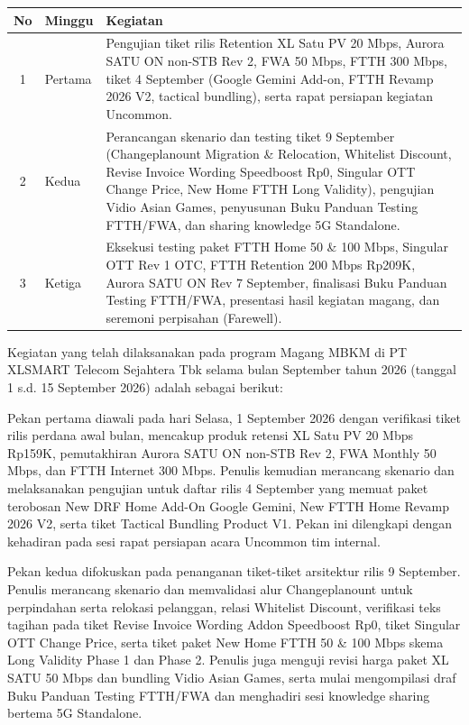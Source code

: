 \documentclass[12pt,a4paper]{article}
\begin{document}
\vspace{0.2cm}
\begin{singlespace}
\noindent
\begin{tabular}{|c|p{2.0cm}|p{11.5cm}|}
\hline
\textbf{No} & \textbf{Minggu} & \textbf{Kegiatan} \\
\hline
1 & Pertama & Pengujian tiket rilis Retention XL Satu PV 20 Mbps, Aurora SATU ON non-STB Rev 2, FWA 50 Mbps, FTTH 300 Mbps, tiket 4 September (Google Gemini Add-on, FTTH Revamp 2026 V2, tactical bundling), serta rapat persiapan kegiatan Uncommon. \\
\hline
2 & Kedua & Perancangan skenario dan testing tiket 9 September (Changeplanount Migration \& Relocation, Whitelist Discount, Revise Invoice Wording Speedboost Rp0, Singular OTT Change Price, New Home FTTH Long Validity), pengujian Vidio Asian Games, penyusunan Buku Panduan Testing FTTH/FWA, dan sharing knowledge 5G Standalone. \\
\hline
3 & Ketiga & Eksekusi testing paket FTTH Home 50 \& 100 Mbps, Singular OTT Rev 1 OTC, FTTH Retention 200 Mbps Rp209K, Aurora SATU ON Rev 7 September, finalisasi Buku Panduan Testing FTTH/FWA, presentasi hasil kegiatan magang, dan seremoni perpisahan (Farewell). \\
\hline
\end{tabular}
\end{singlespace}

\clearpage
\noindent Kegiatan yang telah dilaksanakan pada program Magang MBKM di PT XLSMART Telecom Sejahtera Tbk selama bulan September tahun 2026 (tanggal 1 s.d. 15 September 2026) adalah sebagai berikut:

Pekan pertama diawali pada hari Selasa, 1 September 2026 dengan verifikasi tiket rilis perdana awal bulan, mencakup produk retensi XL Satu PV 20 Mbps Rp159K, pemutakhiran Aurora SATU ON non-STB Rev 2, FWA Monthly 50 Mbps, dan FTTH Internet 300 Mbps. Penulis kemudian merancang skenario dan melaksanakan pengujian untuk daftar rilis 4 September yang memuat paket terobosan New DRF Home Add-On Google Gemini, New FTTH Home Revamp 2026 V2, serta tiket Tactical Bundling Product V1. Pekan ini dilengkapi dengan kehadiran pada sesi rapat persiapan acara Uncommon tim internal.

Pekan kedua difokuskan pada penanganan tiket-tiket arsitektur rilis 9 September. Penulis merancang skenario dan memvalidasi alur Changeplanount untuk perpindahan serta relokasi pelanggan, relasi Whitelist Discount, verifikasi teks tagihan pada tiket Revise Invoice Wording Addon Speedboost Rp0, tiket Singular OTT Change Price, serta tiket paket New Home FTTH 50 \& 100 Mbps skema Long Validity Phase 1 dan Phase 2. Penulis juga menguji revisi harga paket XL SATU 50 Mbps dan bundling Vidio Asian Games, serta mulai mengompilasi draf Buku Panduan Testing FTTH/FWA dan menghadiri sesi knowledge sharing bertema 5G Standalone.
\end{document}
